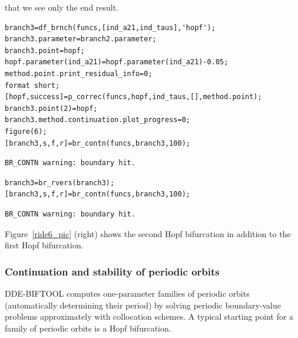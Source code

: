 \documentclass[10pt]{scrartcl}
\newcommand{\DDEBIFCODE}{\textsc{DDE-BIFTOOL}}
\begin{document}
that we see only the end result.
\begin{lstlisting}
branch3=df_brnch(funcs,[ind_a21,ind_taus],'hopf');
branch3.parameter=branch2.parameter;
branch3.point=hopf;
hopf.parameter(ind_a21)=hopf.parameter(ind_a21)-0.05;
method.point.print_residual_info=0;
format short;
[hopf,success]=p_correc(funcs,hopf,ind_taus,[],method.point);
branch3.point(2)=hopf;
branch3.method.continuation.plot_progress=0;
figure(6);
[branch3,s,f,r]=br_contn(funcs,branch3,100);
\end{lstlisting}
{\small
\begin{verbatim}
BR_CONTN warning: boundary hit.
\end{verbatim}}
\begin{lstlisting}
branch3=br_rvers(branch3);
[branch3,s,f,r]=br_contn(funcs,branch3,100);  
\end{lstlisting}
{\small
\begin{verbatim}
BR_CONTN warning: boundary hit.
\end{verbatim}
} Figure~\ref{ride6_pic} (right) shows the second Hopf bifurcation in
addition to the first Hopf bifurcation.

\subsubsection{Continuation and stability of periodic orbits}
\label{sec:psol}
\DDEBIFCODE{} computes one-parameter families of periodic orbits
(automatically determining their period) by solving periodic
boundary-value problems approximately with collocation schemes. A
typical starting point for a family of periodic orbits is a Hopf
bifurcation.
\end{document}
